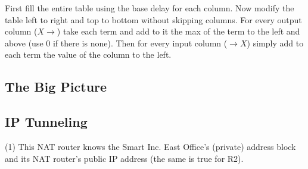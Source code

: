 First fill the entire table using the base delay for each column. Now
modify the table left to right and top to bottom without skipping
columns. For every output column ($X\to$) take each term and add to it
the max of the term to the left and above (use 0 if there is none). Then
for every input column ($\to X$) simply add to each term the value of
the column to the left.
\subsection{The Big Picture}
\begin{center}
\end{center}
\subsection{IP Tunneling}
\begin{center}
\end{center}
(1) This NAT router knows the Smart Inc. East Office’s (private) address
block and its NAT router’s public IP address (the same is true for R2).

